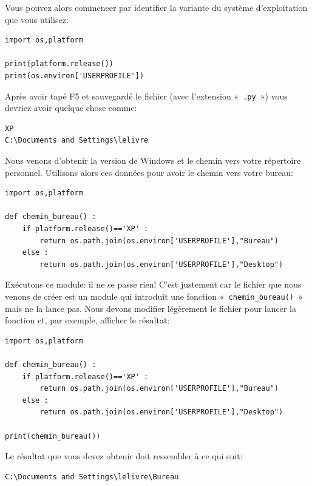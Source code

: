 Vous pouvez alors commencer par identifier la variante du système d'exploitation que vous utilisez:
\begin{Verbatim}[frame=single,rulecolor=\color{mbleu}, label=à taper]
import os,platform

print(platform.release())
print(os.environ['USERPROFILE'])
\end{Verbatim}

Après avoir tapé F5 et sauvegardé le fichier (avec l'extension «~\texttt{.py}~»)  vous devriez avoir quelque chose comme:

\begin{Verbatim}[frame=single,rulecolor=\color{gray}, label=résultat]
XP
C:\Documents and Settings\lelivre
\end{Verbatim}

Nous venons d'obtenir la version de Windows et le chemin vers votre répertoire personnel.
Utilisons alors ces données pour avoir le chemin vers votre bureau:

\begin{Verbatim}[frame=single,rulecolor=\color{mbleu}, label=à taper]
import os,platform

def chemin_bureau() :
    if platform.release()=='XP' :
        return os.path.join(os.environ['USERPROFILE'],"Bureau")
    else :
        return os.path.join(os.environ['USERPROFILE'],"Desktop")
\end{Verbatim}

Exécutons ce module: il ne se passe rien! C'est justement car le fichier que nous venons de créer est un module qui introduit une fonction «~\texttt{chemin\_bureau()}~» mais ne la lance pas. Nous devons modifier légèrement le fichier pour lancer la fonction et, par exemple, afficher le résultat:

\begin{Verbatim}[frame=single,rulecolor=\color{mbleu}, label=à taper]
import os,platform

def chemin_bureau() :
    if platform.release()=='XP' :
        return os.path.join(os.environ['USERPROFILE'],"Bureau")
    else :
        return os.path.join(os.environ['USERPROFILE'],"Desktop")
    
print(chemin_bureau())
\end{Verbatim}

Le résultat que vous devez obtenir doit ressembler à ce qui suit:

\begin{Verbatim}[frame=single,rulecolor=\color{gray}, label=résultat]
C:\Documents and Settings\lelivre\Bureau
\end{Verbatim}

